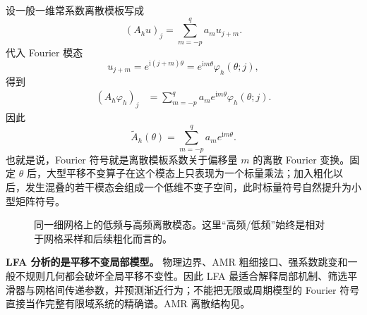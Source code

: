 设一般一维常系数离散模板写成
\begin{equation}
(A_hu)_j
=
\sum_{m=-p}^{q}a_m u_{j+m}.
\label{eq:lfa-general-stencil}
\end{equation}
代入 Fourier 模态
\begin{equation}
u_{j+m}
=
e^{\mathrm i(j+m)\theta}
=
e^{\mathrm im\theta}\varphi_h(\theta;j),
\end{equation}
得到
\begin{align}
(A_h\varphi_h)_j
&=
\sum_{m=-p}^{q}
a_me^{\mathrm im\theta}\varphi_h(\theta;j).
\end{align}
因此
\begin{equation}
\boxed{
\widetilde A_h(\theta)
=
\sum_{m=-p}^{q}a_me^{\mathrm im\theta}.
}
\label{eq:lfa-general-symbol-formula}
\end{equation}
也就是说，Fourier 符号就是离散模板系数关于偏移量 $m$ 的离散 Fourier 变换。固定 $\theta$ 后，大型平移不变算子在这个模态上只表现为一个标量乘法；加入粗化以后，发生混叠的若干模态会组成一个低维不变子空间，此时标量符号自然提升为小型矩阵符号\cite{wienands2004}。

\begin{figure}[htbp]
\centering
{}
\caption{同一细网格上的低频与高频离散模态。这里“高频/低频”始终是相对于网格采样和后续粗化而言的。}
\label{fig:lfa-low-high-modes}
\end{figure}

\begin{warningbox}
\textbf{LFA 分析的是平移不变局部模型。}
物理边界、AMR 粗细接口、强系数跳变和一般不规则几何都会破坏全局平移不变性。因此 LFA 最适合解释局部机制、筛选平滑器与网格间传递参数，并预测渐近行为；不能把无限或周期模型的 Fourier 符号直接当作完整有限域系统的精确谱。AMR 离散结构见。
\end{warningbox}

